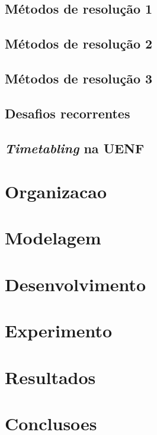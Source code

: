 \section{Métodos de resolução 1}
\cite{alegre_desenvolvimento_2012}
\section{Métodos de resolução 2}
\cite{arratia-martinez_university_2021}
\section{Métodos de resolução 3}
\cite{bebis_information_2019} %
\section{Desafios recorrentes}
\cite{miranda_udpskeduler_2012}
\cite{Murray2007}
\cite{Andre2018}
\cite{Alencar2019}
\section{\textit{Timetabling} na UENF}
\cite{Sanya2013}
\cite{Ricardo2014}
\chapter{Organizacao}
\chapter{Modelagem}
\chapter{Desenvolvimento}
\chapter{Experimento}
\chapter{Resultados}
\chapter{Conclusoes}

\postextual{} %




